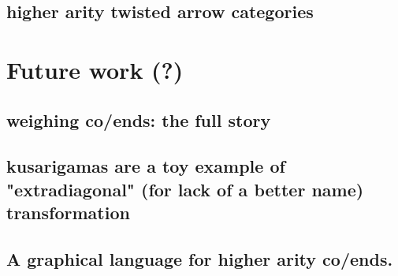 \documentclass[11pt]{amsart}
\begin{document}
\subsection{higher arity twisted arrow categories}
\label{sec:orgf2998fd}
\section{Future work (?)}
\label{sec:org06e498e}
\subsection{weighing co/ends: the full story}
\label{sec:orgd095d54}
\subsection{kusarigamas are a toy example of "extradiagonal" (for lack of a better name) transformation}
\label{sec:org8578925}
\subsection{A graphical language for higher arity co/ends.}
\label{sec:org2f3574c}
\end{document}
